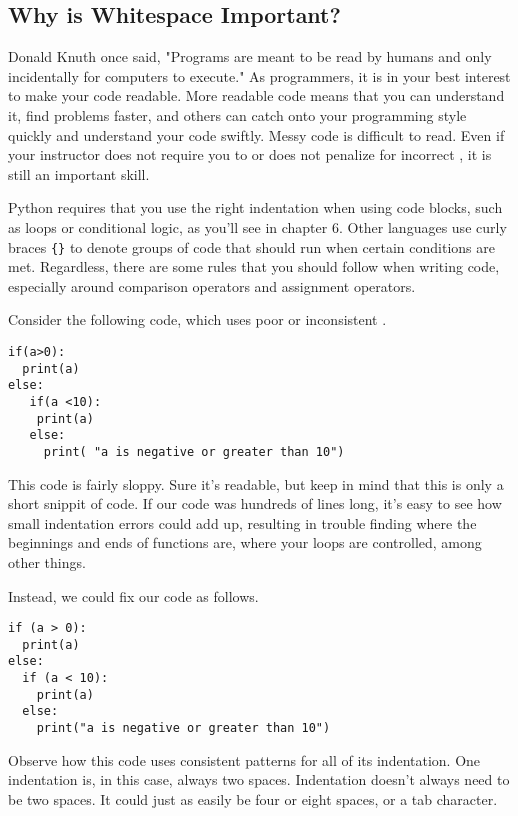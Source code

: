 \subsection{Why is Whitespace Important?}
Donald Knuth once said, "Programs are meant to be read by humans and only incidentally for computers to execute." As programmers, it is in your best interest to make your code readable. More readable code means that you can understand it, find problems faster, and others can catch onto your programming style quickly and understand your code swiftly. Messy code is difficult to read. Even if your instructor does not require you to or does not penalize for incorrect , it is still an important skill.\par
Python requires that you use the right indentation when using code blocks, such as loops or conditional logic, as you'll see in chapter 6. Other languages use curly braces \verb|{}| to denote groups of code that should run when certain conditions are met. Regardless, there are some rules that you should follow when writing code, especially around comparison operators and assignment operators.\par
Consider the following code, which uses poor or inconsistent .\par
\begin{lstlisting}[style=pippython]
if(a>0):
  print(a)
else:
   if(a <10):
    print(a)
   else:
     print( "a is negative or greater than 10")
\end{lstlisting}
This code is fairly sloppy. Sure it's readable, but keep in mind that this is only a short snippit of code. If our code was hundreds of lines long, it's easy to see how small indentation errors could add up, resulting in trouble finding where the beginnings and ends of functions are, where your loops are controlled, among other things.\par
Instead, we could fix our code as follows.\par
\begin{lstlisting}[style=pippython]
if (a > 0):
  print(a)
else:
  if (a < 10):
    print(a)
  else:
    print("a is negative or greater than 10")
\end{lstlisting}
Observe how this code uses consistent  patterns for all of its indentation. One indentation is, in this case, always two spaces. Indentation doesn't always need to be two spaces. It could just as easily be four or eight spaces, or a tab character.\par
